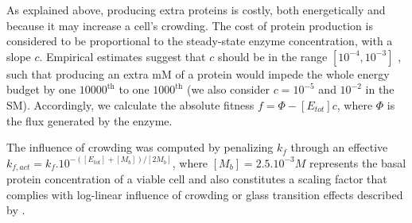 As explained above, producing extra proteins is costly, both energetically and because it may increase a cell's crowding. The cost of protein production is considered to be proportional to the steady-state enzyme concentration, with a slope $c$. Empirical estimates suggest that $c$ should be in the range $[10^{-4}, 10^{-3}]$ \citep{Wagner05,Lynch15}, such that producing an extra mM of a protein would impede the whole energy budget by one $10000^\text{th}$ to one $1000^\text{th}$ (we also consider $c=10^{-5}$ and $10^{-2}$ in the SM). Accordingly, we calculate the absolute fitness $f=\Phi-[E_{tot}]c$, where $\Phi$ is the flux generated by the enzyme. 

The influence of crowding was computed by penalizing $k_f$ through an effective $k_{f,act}=k_f.10^{-([E_{tot}]+[M_b])/[2M_b]}$, where $[M_b]=2.5.10^{-3}M$ represents the basal protein concentration of a viable cell and also constitutes a scaling factor that complies with \citet{Andrews20} log-linear influence of crowding or glass transition effects described by \citep{Dill11}.




